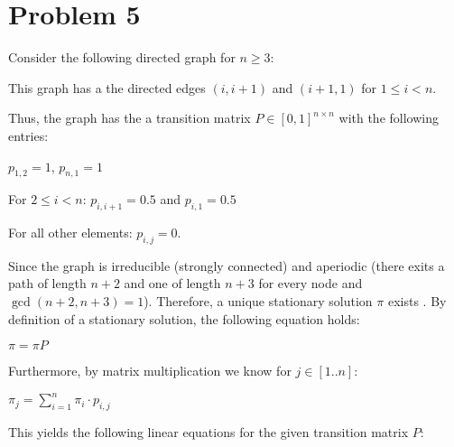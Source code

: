 \section*{Problem 5}

Consider the following directed graph for $n \geq 3$:


This graph has a the directed edges $(i, i+1)$ and $(i+1, 1)$ for $1 \leq i < n$.

Thus, the graph has the a transition matrix $P \in [0, 1]^{n \times n}$ with the following entries:

$p_{1,2} = 1$,
$p_{n,1} = 1$

For $2 \leq i < n$: $p_{i, i + 1} = 0.5$ and $p_{i, 1} = 0.5$ 

For all other elements: $p_{i,j} = 0$.

Since the graph is irreducible (strongly connected) and aperiodic (there exits a path of length $n + 2$ and one of length $n + 3$ for every node and $\operatorname{gcd}(n + 2, n + 3) = 1$). Therefore, a unique stationary solution $\pi$ exists . By definition of a stationary solution, the following equation holds:

$\pi = \pi P$

Furthermore, by matrix multiplication we know for $j \in [1..n]$:

$\pi_j = \sum\limits_{i = 1}^n \pi_i \cdot p_{i,j}$

This yields the following linear equations for the given transition matrix $P$:

